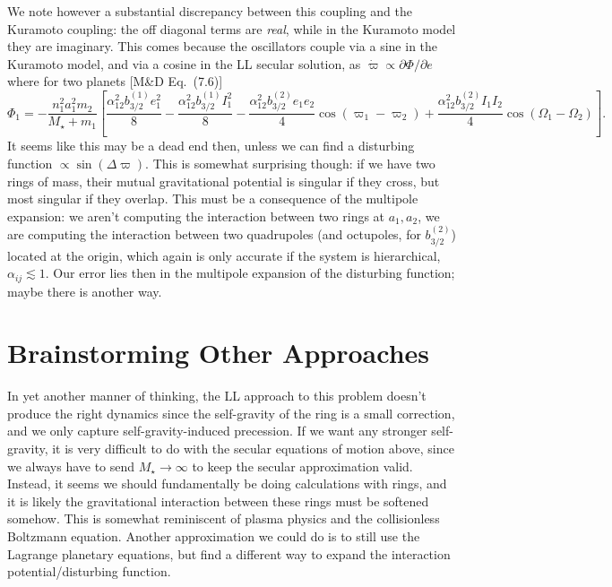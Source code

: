\documentclass[11pt,
        usenames, %
        dvipsnames %
    ]{article}
\newcommand*{\pdil}[2]{\partial#1 / \partial#2}
\newcommand*{\p}[1]{\left(#1\right)}
\newcommand*{\s}[1]{\left[#1\right]}
\begin{document}
We note however a substantial discrepancy between this coupling and the Kuramoto
coupling: the off diagonal terms are \emph{real}, while in the Kuramoto model
they are imaginary. This comes because the oscillators couple via a sine in the
Kuramoto model, and via a cosine in the LL secular solution, as $\dot{\varpi}
\propto \pdil{\Phi}{e}$ where for two planets [M\&D Eq.~(7.6)]
\begin{equation}
    \Phi_1 = -\frac{n_1^2a_1^2m_2}{M_\star + m_1}\s{
        \frac{\alpha_{12}^2 b_{3/2}^{(1)}e_1^2}{8}
        - \frac{\alpha_{12}^2 b_{3/2}^{(1)}I_1^2}{8}
        - \frac{\alpha_{12}^2 b_{3/2}^{(2)}e_1e_2}{4}
            \cos\p{\varpi_1 - \varpi_2}
        + \frac{\alpha_{12}^2 b_{3/2}^{(2)}I_1I_2}{4}
            \cos\p{\Omega_1 - \Omega_2}}.
\end{equation}
It seems like this may be a dead end then, unless we can find a disturbing
function $\propto \sin\p{\Delta \varpi}$. This is somewhat surprising though: if
we have two rings of mass, their mutual gravitational potential is singular if
they cross, but most singular if they overlap. This must be a consequence of the
multipole expansion: we aren't computing the interaction between two rings at
$a_1, a_2$, we are computing the interaction between two quadrupoles (and
octupoles, for $b_{3/2}^{(2)}$) located at the origin, which again is only
accurate if the system is hierarchical, $\alpha_{ij} \lesssim 1$. Our error lies
then in the multipole expansion of the disturbing function; maybe there is
another way.

\section{Brainstorming Other Approaches}

In yet another manner of thinking, the LL approach to this problem doesn't
produce the right dynamics since the self-gravity of the ring is a small
correction, and we only capture self-gravity-induced precession. If we want any
stronger self-gravity, it is very difficult to do with the secular equations of
motion above, since we always have to send $M_\star \to \infty$ to keep the
secular approximation valid. Instead, it seems we should fundamentally be doing
calculations with rings, and it is likely the gravitational interaction between
these rings must be softened somehow. This is somewhat reminiscent of plasma
physics and the collisionless Boltzmann equation. Another approximation we could
do is to still use the Lagrange planetary equations, but find a different way to
expand the interaction potential/disturbing function.
\end{document}
